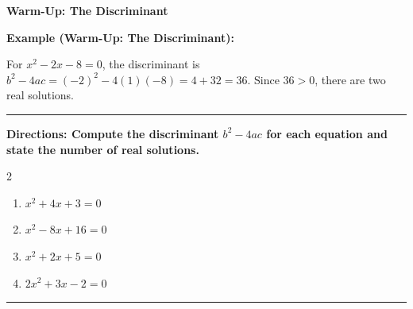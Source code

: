 \documentclass[12pt]{article}
\begin{document}
\vspace{0.35cm}

\begin{center}{\Large \textbf{Warm-Up: The Discriminant}}\end{center}\vspace{0.2cm}
\textbf{Example (Warm-Up: The Discriminant):}

For $x^2-2x-8=0$, the discriminant is $b^2-4ac=(-2)^2-4(1)(-8)=4+32=36$. Since $36>0$, there are two real solutions.

\vspace{0.2cm}\hrule\vspace{0.35cm}
\textbf{Directions: Compute the discriminant $b^2-4ac$ for each equation and state the number of real solutions.}

\begin{multicols}{2}
\begin{enumerate}[label=\textbf{\arabic*.}, start=1, itemsep=1.3cm]
  \item $\displaystyle x^2+4x+3=0$
  \item $\displaystyle x^2-8x+16=0$
  \item $\displaystyle x^2+2x+5=0$
  \item $\displaystyle 2x^2+3x-2=0$
\end{enumerate}
\end{multicols}
\vspace{0.25cm}\hrule\vspace{0.35cm}
\end{document}
